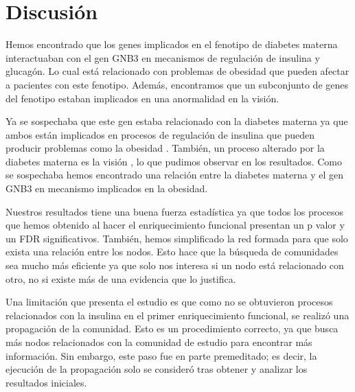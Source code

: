 \section{Discusión}
Hemos encontrado que los genes implicados en el fenotipo de diabetes materna interactuaban con el gen GNB3 en mecanismos de regulación de insulina y glucagón. Lo cual está relacionado con problemas de obesidad que pueden afectar a pacientes con este fenotipo. Además, encontramos que un subconjunto de genes del fenotipo estaban implicados en una anormalidad en la visión.

Ya se sospechaba que este gen estaba relacionado con la diabetes materna \cite{Feng2019} ya que ambos están implicados en procesos de regulación de insulina \cite{Rodolaki2023, Feng2019} que pueden producir problemas como la obesidad \cite{Shah2011}. También, un proceso alterado por la diabetes materna es la visión \cite{Nelson1986}, lo que pudimos observar en los resultados. Como se sospechaba hemos encontrado una relación entre la diabetes materna y el gen GNB3 en mecanismo implicados en la obesidad.

Nuestros resultados tiene una buena fuerza estadística ya que todos los procesos que hemos obtenido al hacer el enriquecimiento funcional presentan un p valor y un FDR significativos. También, hemos simplificado la red formada para que solo exista una relación entre los nodos. Esto hace que la búsqueda de comunidades sea mucho más eficiente ya que solo nos interesa si un nodo está relacionado con otro, no si existe más de una evidencia que lo justifica.

Una limitación que presenta el estudio es que como no se obtuvieron procesos relacionados con la insulina en el primer enriquecimiento funcional, se realizó una propagación de la comunidad. Esto es un procedimiento correcto, ya que busca más nodos relacionados con la comunidad de estudio para encontrar más información. Sin embargo, este paso fue en parte premeditado; es decir, la ejecución de la propagación solo se consideró tras obtener y analizar los resultados iniciales.

